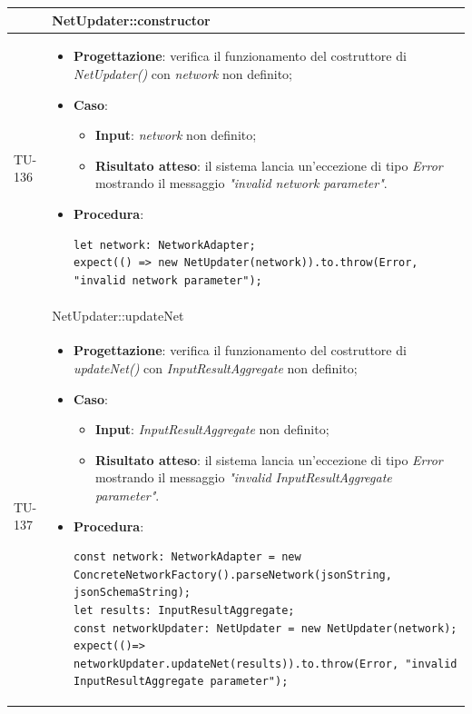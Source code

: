 \begin{longtable}{|C{1.5cm}|C{14.5cm}|}
\hline
{} & NetUpdater::constructor
\\ \hline
{TU-136} &
\begin{itemize}
	\item \textbf{Progettazione}: verifica il funzionamento del costruttore di \emph{NetUpdater()} con \emph{network} non definito;
	\item \textbf{Caso}: 
	\begin{itemize}
		\item \textbf{Input}: \emph{network} non definito;
		\item \textbf{Risultato atteso}: il sistema lancia un'eccezione di tipo \emph{Error} mostrando il messaggio \emph{"invalid network parameter"}.
	\end{itemize}
	\item \textbf{Procedura}:
	\begin{lstlisting}
let network: NetworkAdapter;
expect(() => new NetUpdater(network)).to.throw(Error, "invalid network parameter");
	\end{lstlisting}
\end{itemize}\\
\hline
{} & NetUpdater::updateNet
\\ \hline
{TU-137} &
\begin{itemize}
	\item \textbf{Progettazione}: verifica il funzionamento del costruttore di \emph{updateNet()} con \emph{InputResultAggregate} non definito;
	\item \textbf{Caso}: 
	\begin{itemize}
		\item \textbf{Input}: \emph{InputResultAggregate} non definito;
		\item \textbf{Risultato atteso}: il sistema lancia un'eccezione di tipo \emph{Error} mostrando il messaggio \emph{"invalid InputResultAggregate parameter"}.
	\end{itemize}
	\item \textbf{Procedura}:
	\begin{lstlisting}
const network: NetworkAdapter = new ConcreteNetworkFactory().parseNetwork(jsonString, jsonSchemaString);
let results: InputResultAggregate;
const networkUpdater: NetUpdater = new NetUpdater(network);
expect(()=> networkUpdater.updateNet(results)).to.throw(Error, "invalid InputResultAggregate parameter");
	\end{lstlisting}
\end{itemize}\\

\end{longtable}

